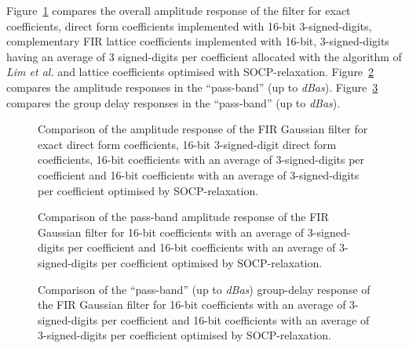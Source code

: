 \documentclass[a4paper,twoside,10pt,english]{report}
\begin{document}
Figure~\ref{fig:socp-relaxation-gaussian-FIR-lattice-16-nbits-min-response}
compares the overall amplitude response of the filter for exact coefficients,
direct form coefficients implemented with 16-bit 3-signed-digits,
complementary FIR lattice coefficients implemented with 16-bit,
3-signed-digits having an average of 3 signed-digits per coefficient allocated
with the algorithm of \emph{Lim et al.} and lattice coefficients optimised
with SOCP-relaxation.
Figure~\ref{fig:socp-relaxation-gaussian-FIR-lattice-16-nbits-min-pass-response}
compares the amplitude responses in the ``pass-band'' (up to \emph{dBas}).
Figure~\ref{fig:socp-relaxation-gaussian-FIR-lattice-16-nbits-min-delay-response}
compares the group delay responses in the ``pass-band'' (up to \emph{dBas}).
\begin{figure}[!htbp]
\begin{center}
\scalebox{0.7}{}
\caption{Comparison of the amplitude response of the FIR Gaussian filter for
  exact direct form coefficients, 16-bit 3-signed-digit direct form
  coefficients, 16-bit coefficients with an average of 3-signed-digits per
  coefficient and 16-bit coefficients with an average of 3-signed-digits per
  coefficient optimised by SOCP-relaxation.}
\label{fig:socp-relaxation-gaussian-FIR-lattice-16-nbits-min-response}
\end{center}
\end{figure}
\begin{figure}[!htbp]
\begin{center}
\scalebox{0.7}{}
\caption{Comparison of the pass-band amplitude
  response of the FIR Gaussian filter for 16-bit coefficients with an average
  of 3-signed-digits per coefficient and 16-bit coefficients with an average
  of 3-signed-digits per coefficient optimised by SOCP-relaxation.}
\label{fig:socp-relaxation-gaussian-FIR-lattice-16-nbits-min-pass-response}
\end{center}
\end{figure}
\begin{figure}[!htbp]
\begin{center}
\scalebox{0.7}{}
\caption{Comparison of the ``pass-band'' (up to \emph{dBas}) group-delay
  response of the FIR Gaussian filter for 16-bit coefficients with an average
  of 3-signed-digits per coefficient and 16-bit coefficients with an average
  of 3-signed-digits per coefficient optimised by SOCP-relaxation.}
\label{fig:socp-relaxation-gaussian-FIR-lattice-16-nbits-min-delay-response}
\end{center}
\end{figure}
\end{document}
